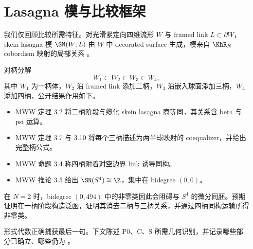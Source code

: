 \section{Lasagna 模与比较框架}

我们仅回顾比较所需特征。对光滑紧定向四维流形 $W$ 与 framed link $L\subset\partial W$，skein lasagna 模 $\SN(W;L)$ 由 $W$ 中 decorated surface 生成，模来自 $\KhR_N$ cobordism 映射的局部关系 \cite{MorrisonWalkerWedrich2019,ManolescuWalkerWedrich2023}。

对柄分解
\[
W_1\subset W_2\subset W_3\subset W_4,
\]
其中 $W_1$ 为一柄体，$W_2$ 沿 framed link 添加二柄，$W_3$ 沿嵌入球面添加三柄，$W_4$ 添加四柄，公开结果作用如下。
\begin{itemize}
\item MWW 定理 3.2 将二柄阶段与缆化 skein lasagna 商等同，其关系含 beta 与 psi 运算。
\item MWW 定理 3.7 与 3.10 将每个三柄描述为两半球映射的 coequalizer，并给出完整柄公式。
\item MWW 命题 3.4 称四柄附着对空边界 link 诱导同构。
\item MWW 推论 3.5 给出 $\SN(S^4)\cong\Z$，集中在 bidegree $(0,0)$。
\end{itemize}

在 $N=2$ 时，bidegree $(0,494)$ 中的非零类因此会阻碍与 $S^4$ 的微分同胚。预期证明在一柄阶段构造泛函，证明其消去二柄与三柄关系，并通过四柄同构运输所得非零类。

形式代数正确捕获最后一句。下文陈述 P0、C、S 所需几何识别，并记录哪些部分已确立、哪些仍为 \Open。
